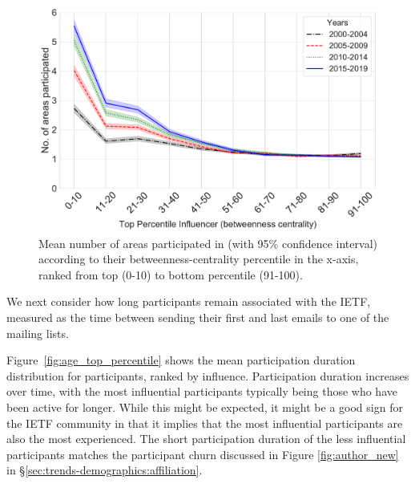 \documentclass[twocolumn,10pt]{article}
\newlength{\figureWidthOneColumn}
\newcommand{\pb}[1]{\vspace{0.75ex}\noindent{\textbf{#1}}}
\begin{document}
\begin{figure}
  \centering
  \includegraphics[width=\figureWidthOneColumn]{figures-prev/icwsm-2022/lineplot_avg_areas_top_percentile.pdf}
  \caption{
    Mean number of areas participated in (with 95\% confidence interval)
    according to their betweenness-centrality percentile in the x-axis,
    ranked from top (0-10) to bottom percentile (91-100).
  }
  \label{fig:areas_participation_top_percentile}
\end{figure}

\pb{Participation duration:}
We next consider how long participants remain associated with the IETF,
measured as the time between sending their first and last emails to one of
the mailing lists.

Figure~\ref{fig:age_top_percentile} shows the mean participation duration
distribution for participants, ranked by influence. Participation duration
increases over time, with the most influential participants typically being
those who have been active for longer. While this might be expected, it
might be a good sign for the IETF community in that it implies that the
most influential participants are also the most experienced.
The short participation duration of the less influential participants
matches the participant churn discussed in Figure \ref{fig:author_new}
in \S\ref{sec:trends-demographics:affiliation}.
\end{document}
